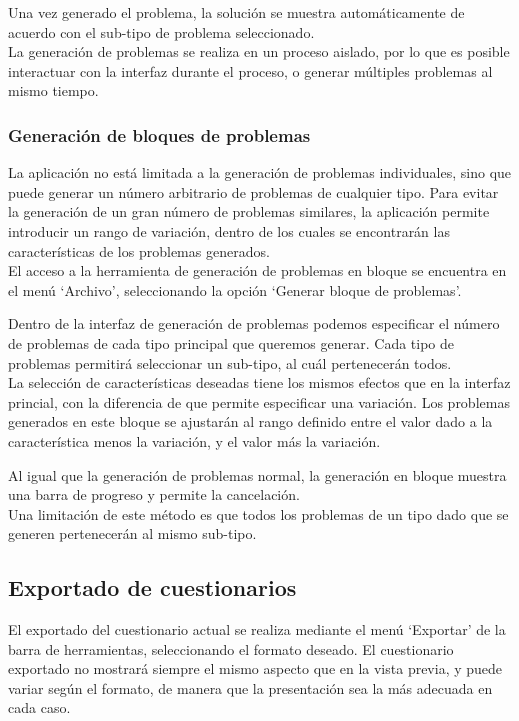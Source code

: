 Una vez generado el problema, la solución se muestra automáticamente de acuerdo con el sub-tipo de problema seleccionado.
\\
La generación de problemas se realiza en un proceso aislado, por lo que es posible interactuar con la interfaz durante el proceso, o generar múltiples problemas al mismo tiempo.

\subsubsection{Generación de bloques de problemas}
La aplicación no está limitada a la generación de problemas individuales, sino que puede generar un número arbitrario de problemas de cualquier tipo.
Para evitar la generación de un gran número de problemas similares, la aplicación permite introducir un rango de variación, dentro de los cuales se encontrarán las características de los problemas generados.
\\
El acceso a la herramienta de generación de problemas en bloque se encuentra en el menú `Archivo', seleccionando la opción `Generar bloque de problemas'.


Dentro de la interfaz de generación de problemas podemos especificar el número de problemas de cada tipo principal que queremos generar.
Cada tipo de problemas permitirá seleccionar un sub-tipo, al cuál pertenecerán todos.
\\
La selección de características deseadas tiene los mismos efectos que en la interfaz princial, con la diferencia de que permite especificar una variación.
Los problemas generados en este bloque se ajustarán al rango definido entre el valor dado a la característica menos la variación, y el valor más la variación.


Al igual que la generación de problemas normal, la generación en bloque muestra una barra de progreso y permite la cancelación.
\\
Una limitación de este método es que todos los problemas de un tipo dado que se generen pertenecerán al mismo sub-tipo.

\subsection{Exportado de cuestionarios}
El exportado del cuestionario actual se realiza mediante el menú `Exportar' de la barra de herramientas, seleccionando el formato deseado.
El cuestionario exportado no mostrará siempre el mismo aspecto que en la vista previa, y puede variar según el formato, de manera que la presentación sea la más adecuada en cada caso.

